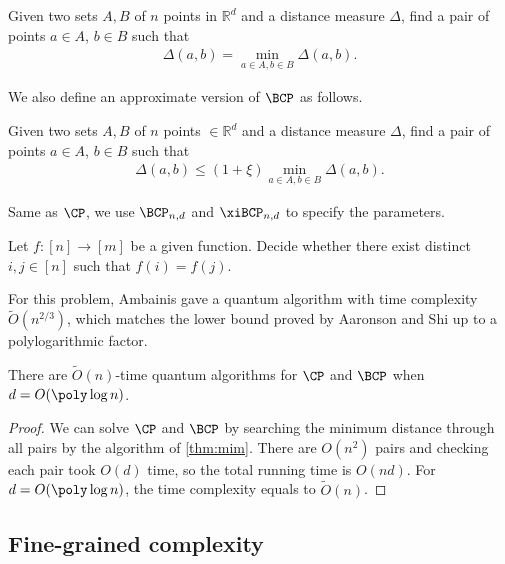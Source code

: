 \begin{definition}
Given two sets $A,B$ of $n$ points in $\mathbb R^d$ and a distance measure $\Delta$, find a pair of points $a\in A$, $b\in B$ such that 
\begin{align}
    \Delta(a,b)= \min_{a\in A,b\in B} \Delta(a,b).
\end{align}
\end{definition}
We also define an approximate version of $\BCP$ as follows.
\begin{definition}
Given two sets $A,B$ of $n$ points $\in \mathbb R^d$ and a distance measure $\Delta$, find a pair of points $a\in A$, $b\in B$ such that 
\begin{align}
    \Delta(a,b) \leq (1+\xi)\min_{a\in A,b\in B} \Delta(a,b).
\end{align}
\end{definition}
Same as $\CP$, we use $\BCP_{n,d}$ and $\xiBCP_{n, d}$ to specify the parameters. 

\begin{definition}
  Let $f:[n] \rightarrow [m]$ be a given function. Decide whether there exist distinct $i, j\in[n]$ such that $f(i) = f(j)$.
\end{definition}

For this problem, Ambainis \cite{r5} gave a quantum algorithm with time complexity $\tilde{O}(n^{2/3})$, which matches the lower bound proved by Aaronson and Shi \cite{r1} up to a polylogarithmic factor.

\begin{theorem}\label{cor:trivial_alg}
There are $\tilde{O}(n)$-time quantum algorithms for $\CP$ and $\BCP$ when $d=O(\poly\log n)$.
\end{theorem}
\begin{proof}
We can solve $\CP$ and $\BCP$ by searching the minimum distance through all pairs by the algorithm of \cref{thm:mim}. There are $O(n^2)$ pairs and checking each pair took $O(d)$ time, so the total running time is $O(nd)$. For $d=O(\poly\log n)$, the time complexity equals to $\tilde{O}(n)$.
\end{proof}

\subsection{Fine-grained complexity}

